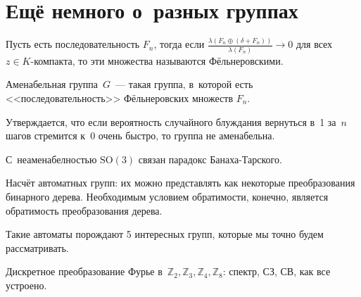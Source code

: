 \documentclass{article}
\begin{document}
\section{Ещё немного о~разных группах}

\begin{definition}
	Пусть есть последовательность $F_n$, тогда если $\frac{\lambda(F_n \oplus
	(\delta + F_n))}{\lambda(F_n)} \rightarrow 0$ для всех $z \in K$-компакта, то
	эти множества называются Фёльнеровскими.
\end{definition}

\begin{definition}
	Аменабельная группа~$G$~--- такая группа, в~которой есть
	<<последовательность>> Фёльнеровских множеств $F_n$.
\end{definition}

Утверждается, что если вероятность случайного блуждания вернуться в~1 за~$n$
шагов стремится к~0 очень быстро, то группа не аменабельна.

С~неаменабелностью $\text{SO}(3)$ связан парадокс Банаха-Тарского.

Насчёт автоматных групп: их можно представлять как некоторые преобразования
бинарного дерева. Необходимым условием обратимости, конечно, является
обратимость преобразования дерева.

Такие автоматы порождают 5 интересных групп, которые мы точно будем
рассматривать.

\begin{exercise}
	Дискретное преобразование Фурье в~$\mathbb{Z}_2, \mathbb{Z}_3, \mathbb{Z}_4,
	\mathbb{Z}_8$: спектр, СЗ, СВ, как все устроено.
\end{exercise}
\end{document}
